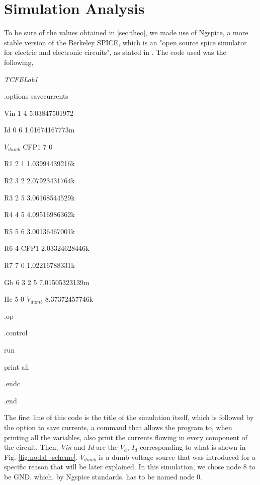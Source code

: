 \section{Simulation Analysis}

To be sure of the values obtained in \ref{sec:theo}, we made use of Ngspice, a more stable version of the Berkeley SPICE, which is an "open source spice simulator for electric and electronic circuits", as stated in \cite{ngsite}. The code used was the following, \\

{\itshape
TCFELab1 \par
.options savecurrents \\\par

Vin 1 4 5.03847501972 \par
Id 0 6 1.01674167773m \par

$V_{dumb}$ CFP1 7 0 \\\par

R1 2 1 1.03994439216k \par
R2 3 2 2.07923431764k \par
R3 2 5 3.06168544529k \par
R4 4 5 4.09516986362k \par
R5 5 6 3.00136467001k \par
R6 4 CFP1 2.03324628446k \par
R7 7 0 1.02216788331k \\\par

Gb 6 3 2 5 7.01505323139m \par
Hc 5 0 $V_{dumb}$ 8.37372457746k \\\par

.op\par
.control\par
    run\par
    print all\par
.endc\par
.end
}

\vspace{10px}
The first line of this code is the title of the simulation itself, which is followed by the option to save currents, a command that allows the program to, when printing all the variables, also print the currents flowing in every component of the circuit. Then, \textit{Vin} and \textit{Id} are the $V_a$, $I_d$ corresponding to what is shown in Fig. \ref{fig:nodal_scheme}. $V_{dumb}$ is a dumb voltage source that was introduced for a specific reason that will be later explained. In this simulation, we chose node 8 to be GND, which, by Ngspice standards, has to be named node 0.\\

